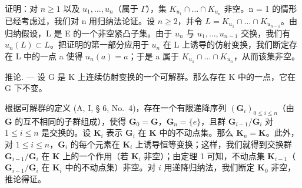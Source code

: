 证明：对 \(n \geqslant 1\) 以及 \(u_{1}, \ldots, u_{n}\)（属于 \(\Gamma\)），集 \(K_{u_{1}} \cap \ldots \cap K_{u_{n}}\) 非空。n = 1 的情形已经考虑过，我们对 n 用归纳法论证。设 \(n \geqslant 2\)，并令 \(L = K_{u_{1}} \cap \ldots \cap K_{u_{n-1}}\)。由归纳假设，L 是 E 的一个非空紧凸子集。由于 \(u_{n}\) 与 \(u_{1}, \ldots, u_{n-1}\) 交换，我们有 \(u_{n}(L) \subset L\)。把证明的第一部分应用于 \(u_{n}\) 在 L 上诱导的仿射变换，我们断定存在 L 中的一点 a 使得 \(u_{n}(a) = a\)；于是 a 属于 \(K_{u_{1}} \cap \ldots \cap K_{u_{n}}\)，从而该集非空。

推论. --- 设 G 是 K 上连续仿射变换的一个可解群。那么存在 K 中的一点，它在 G 下不变。

根据可解群的定义 (A, I, § 6, No.~4)，存在一个有限递降序列 \((\mathbf{G}_i)_{0\leqslant i\leqslant n}\)（由 \(\mathbf{G}\) 的互不相同的子群组成），使得 \(\mathbf{G}_0 = \mathbf{G}\)，\(\mathbf{G}_n = \{e\}\)，且群 \(\mathbf{G}_{i - 1} / \mathbf{G}_i\) 对 \(1\leqslant i\leqslant n\) 是交换的。设 \(\mathbf{K}_i\) 表示 \(\mathbf{G}_i\) 在 \(\mathbf{K}\) 中的不动点集。那么 \(\mathbf{K}_n = \mathbf{K}\)。此外，对 \(1\leqslant i\leqslant n\)，\(\mathbf{G}_i\) 的每个元素在 \(\mathbf{K}_i\) 上诱导恒等变换；这样，我们就得到交换群 \(\mathbf{G}_{i - 1} / \mathbf{G}_i\) 在 \(\mathbf{K}\) 上的一个作用（若 \(\mathbf{K}_i\) 非空）；由定理 1 可知，不动点集 \(\mathbf{K}_{i - 1}\)（\(\mathbf{G}_{i - 1} / \mathbf{G}_i\) 在 \(\mathbf{K}_i\) 中的不动点集）非空。对 \(i\) 用递降归纳法，我们断定 \(\mathbf{K}_0\) 非空，推论得证。


